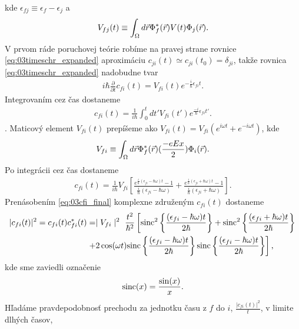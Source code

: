 kde $\epsilon_{fj} \equiv \epsilon_f - \epsilon_j$ a
\begin{equation}
V_{fj}(t) \equiv \int_{\Omega}d\vec{r} \Phi_f^{\ast}(\vec{r})V(t)\Phi_j(\vec{r})  \text{.}
\end{equation}
V prvom ráde poruchovej teórie robíme na pravej strane rovnice  \eqref{eq:03timeschr_expanded} aproximáciu $c_{ji}(t) \simeq c_{ji}(t_0) = \delta_{ji}$,
takže rovnica \eqref{eq:03timeschr_expanded} nadobudne tvar
\begin{align}
\label{eq:03born_appr}
i\hbar\frac{\partial}{\partial t}c_{fi}(t)=V_{fi}(t)e^{-\frac{i}{\hbar}\epsilon_{fi} t}\mathrm{.}
\end{align}
Integrovaním cez čas dostaneme
\begin{align}
\label{eq:03cfi}
c_{fi}(t) = \frac{1}{i\hbar} \int_0^t dt' V_{fi}(t')e^{\frac{-i}{\hbar}\epsilon_{fi} t'} \text{.}
\end{align}.
Maticový element $V_{fi}(t)$ prepíšeme ako $V_{fi}(t)=V_{fi}(e^{i\omega t}+e^{-i\omega t})$, kde
\begin{equation}
\label{eq:03Vfi}
V_{fi} \equiv \int_{\Omega} d\vec{r} \Phi_f^{*}(\vec{r})(\frac{-eEx}{2})\Phi_i(\vec{r}) \text{.}
\end{equation}
Po integrácii cez čas dostaneme
\begin{align}
\label{eq:03cfi_final}
c_{fi}(t)=\frac{1}{i\hbar}V_{fi}\left[\frac{e^{\frac{i}{\hbar}(\epsilon_{fi} - \hbar\omega)t}-1}{\frac{i}{\hbar}(\epsilon_{fi}-\hbar\omega)}+\frac{e^{\frac{i}{\hbar}(\epsilon_{fi} + \hbar\omega)t}-1}{\frac{i}{\hbar}(\epsilon_{fi}+\hbar\omega)}\right] \text{.}
\end{align}
Prenásobením \eqref{eq:03cfi_final} komplexne združeným $c_{fi}(t)$  dostaneme
\begin{align}
\label{eq:03prob}
|c_{fi}(t)|^2=c_{fi}(t)c_{fi}^*(t)
&
=\mid V_{fi}\mid^{2}\ \frac{t^{2}}{\hbar^{2}}
\left[
\mathrm{sinc}^{2}\left\lbrace\frac{(\epsilon_{fi}-\hbar\omega)t}{2\hbar}\right\rbrace
+\mathrm{sinc}^{2}\left\lbrace\frac{(\epsilon_{fi}+\hbar\omega)t}{2\hbar}\right\rbrace
\right.
\\
&
\left.
+2
\cos(\omega t)
 \mathrm{sinc}\left\lbrace\frac{(\epsilon_{fi}-\hbar\omega)t}{2\hbar}\right\rbrace
 \mathrm{sinc}\left\lbrace\frac{(\epsilon_{fi}-\hbar\omega)t}{2\hbar}\right\rbrace
\right]
\text{,} \notag
\end{align}
kde sme zaviedli označenie
\begin{align}
\mathrm{sinc}(x)=\frac{\sin(x)}{x}\text{.}
\end{align}
Hľadáme pravdepodobnosť prechodu za jednotku času z $f$ do $i$, $\frac{|c_{fi}(t)|^2}{t}$, v limite dlhých časov,
